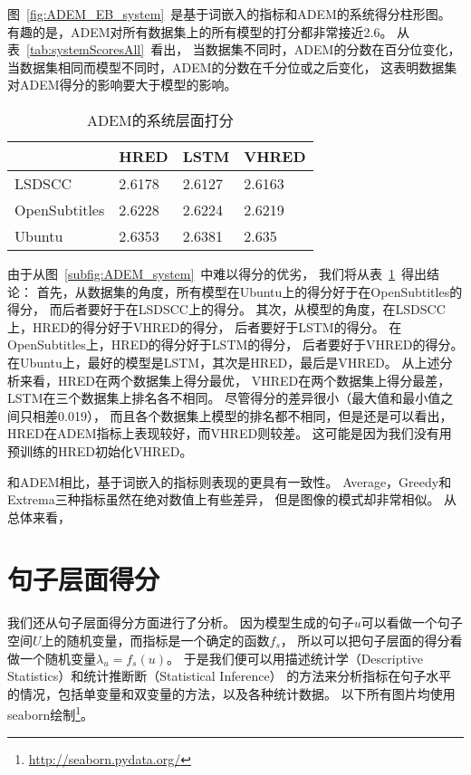 
图~\ref{fig:ADEM_EB_system}~是基于词嵌入的指标和ADEM的系统得分柱形图。
有趣的是，ADEM对所有数据集上的所有模型的打分都非常接近2.6。
从表~\ref{tab:systemScoresAll}~看出，
当数据集不同时，ADEM的分数在百分位变化，
当数据集相同而模型不同时，ADEM的分数在千分位或之后变化，
这表明数据集对ADEM得分的影响要大于模型的影响。
\begin{table}[H]
    \centering
    \caption{ADEM的系统层面打分}
    \label{tab:ADEM_system}
    \begin{tabular}{llll}
        \toprule
        & HRED & LSTM & VHRED \\
        \midrule
        LSDSCC & 2.6178 & 2.6127 & 2.6163  \\
        OpenSubtitles & 2.6228 & 2.6224 & 2.6219 \\
        Ubuntu & 2.6353 & 2.6381 & 2.635 \\
        \bottomrule
    \end{tabular}
\end{table}
由于从图~\ref{subfig:ADEM_system}~中难以得分的优劣，
我们将从表~\ref{tab:ADEM_system}~得出结论：
首先，从数据集的角度，所有模型在Ubuntu上的得分好于在OpenSubtitles的得分，
而后者要好于在LSDSCC上的得分。
其次，从模型的角度，在LSDSCC上，HRED的得分好于VHRED的得分，
后者要好于LSTM的得分。
在OpenSubtitles上，HRED的得分好于LSTM的得分，
后者要好于VHRED的得分。
在Ubuntu上，最好的模型是LSTM，其次是HRED，最后是VHRED。
从上述分析来看，HRED在两个数据集上得分最优，
VHRED在两个数据集上得分最差，
LSTM在三个数据集上排名各不相同。
尽管得分的差异很小（最大值和最小值之间只相差0.019），
而且各个数据集上模型的排名都不相同，但是还是可以看出，
HRED在ADEM指标上表现较好，而VHRED则较差。
这可能是因为我们没有用预训练的HRED初始化VHRED。

和ADEM相比，基于词嵌入的指标则表现的更具有一致性。
Average，Greedy和Extrema三种指标虽然在绝对数值上有些差异，
但是图像的模式却非常相似。
从总体来看，




\section{句子层面得分}\label{sec:utterance_scores}
我们还从句子层面得分方面进行了分析。
因为模型生成的句子$u$可以看做一个句子空间$U$上的随机变量，而指标是一个确定的函数$f_{s}$，
所以可以把句子层面的得分看做一个随机变量$\lambda_u = f_{s}(u)$。
于是我们便可以用描述统计学（Descriptive Statistics）和统计推断断（Statistical Inference）
的方法来分析指标在句子水平的情况，包括单变量和双变量的方法，以及各种统计数据。
以下所有图片均使用seaborn绘制\footnote{\url{http://seaborn.pydata.org/}}。

